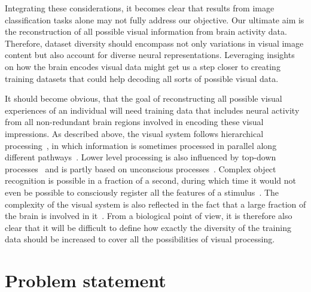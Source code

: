 Integrating these considerations, it becomes clear that results from image classification tasks alone may not fully address our objective. Our ultimate aim is the reconstruction of all possible visual information from brain activity data. Therefore, dataset diversity should encompass not only variations in visual image content but also account for diverse neural representations. Leveraging insights on how the brain encodes visual data might get us a step closer to creating training datasets that could help decoding all sorts of possible visual data. 

It should become obvious, that the goal of reconstructing all possible visual experiences of an individual will need training data that includes neural activity from all non-redundant brain regions involved in encoding these visual impressions. As described above, the visual system follows hierarchical processing~\cite{grill-spectorHUMANVISUALCORTEX2004,horikawaGenericDecodingSeen2017,kamitaniDecodingVisualSubjective2005}, in which information is sometimes processed in parallel along different pathways~\cite{ungerleiderWhatWhereHuman1994,kravitzNewNeuralFramework2011}. Lower level processing is also influenced by top-down processes~\cite{barTopdownFacilitationVisual2006,chengReconstructingVisualIllusory2023} and is partly based on unconscious processes~\cite{kravitzNewNeuralFramework2011}. Complex object recognition is possible in a fraction of a second, during which time it would not even be possible to consciously register all the features of a stimulus~\cite{dicarloHowDoesBrain2012}. The complexity of the visual system is also reflected in the fact that a large fraction of the brain is involved in it~\cite{fellemanDistributedHierarchicalProcessing1991a}. From a biological point of view, it is therefore also clear that it will be difficult to define how exactly the diversity of the training data should be increased to cover all the possibilities of visual processing.


\section{Problem statement}

